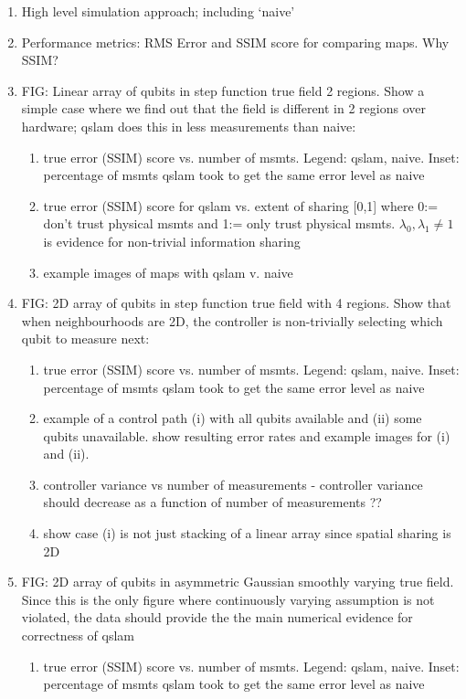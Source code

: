 \begin{enumerate}
	\item High level simulation approach; including `naive' 
	\item Performance metrics: RMS Error and SSIM score for comparing maps. Why SSIM?
	\item FIG: Linear array of qubits in step function true field 2 regions. Show a simple case where we find out that the field is different in 2 regions over hardware; qslam does this in less measurements than naive:
	\begin{enumerate}
		\item true error (SSIM) score vs. number of msmts. Legend: qslam, naive. Inset: percentage of msmts qslam took to get the same error level as naive
		\item true error (SSIM) score for qslam vs. extent of sharing [0,1] where 0:= don't trust physical msmts and 1:= only trust physical msmts. $\lambda_0, \lambda_1 \neq 1$ is evidence for non-trivial information sharing
		\item example images of maps with qslam v. naive
	\end{enumerate}
	\item FIG: 2D array of qubits in step function true field with 4 regions. Show that when neighbourhoods are 2D, the controller is non-trivially selecting which qubit to measure next:
	\begin{enumerate}
		\item true error (SSIM) score vs. number of msmts. Legend: qslam, naive. Inset: percentage of msmts qslam took to get the same error level as naive
		\item example of a control path (i) with all qubits available and (ii) some qubits unavailable. show resulting error rates and example images for (i) and (ii).
		\item controller variance vs number of measurements - controller variance should decrease as a function of number of measurements ??
		\item show case (i) is not just stacking of a linear array since spatial sharing is 2D	
	\end{enumerate}
	\item FIG: 2D array of qubits in asymmetric Gaussian smoothly varying true field. Since this is the only figure where continuously varying assumption is not violated,  the data should provide the the main numerical evidence for correctness of qslam
	\begin{enumerate}
		\item true error (SSIM) score vs. number of msmts. Legend: qslam, naive. Inset: percentage of msmts qslam took to get the same error level as naive

\end{enumerate}
\end{enumerate}
